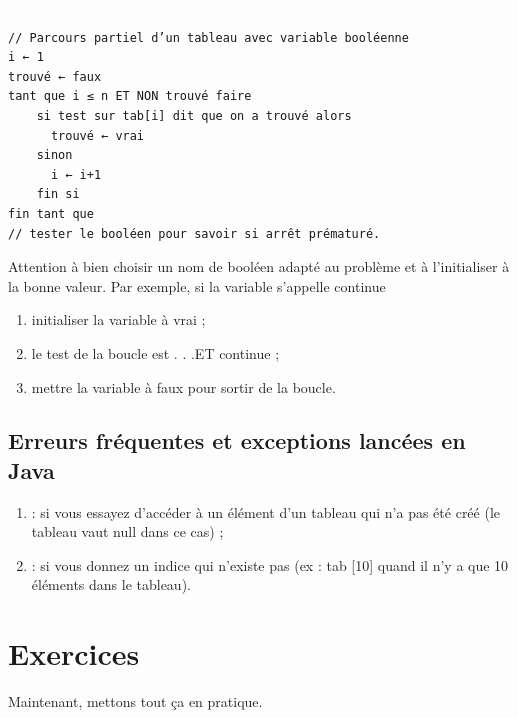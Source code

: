 \documentclass[11pt,a4paper]{article}
\begin{document}
					\textcolor{white}{.} \par
				
            \par
        \begin{verbatim}
// Parcours partiel d’un tableau avec variable booléenne
i ← 1
trouvé ← faux
tant que i ≤ n ET NON trouvé faire
    si test sur tab[i] dit que on a trouvé alors
      trouvé ← vrai
    sinon
      i ← i+1
    fin si
fin tant que
// tester le booléen pour savoir si arrêt prématuré.
      \end{verbatim}
        Attention \`a bien choisir un nom de bool\'een adapt\'e au probl\`eme et \`a l'initialiser \`a la bonne
        valeur. Par exemple, si la variable s'appelle \guillemotleft  continue \guillemotright 
        
					\begin{enumerate}
				
			\item initialiser la variable \`a vrai ;
			\item le test de la boucle est \guillemotleft  . . .ET continue \guillemotright  ;
			\item mettre la variable \`a faux pour sortir de la boucle.
					\end{enumerate}
				
            \par
        \subsection{Erreurs fr\'equentes et exceptions lanc\'ees en Java}
					\begin{enumerate}
				
			\item \verb@NullPointerException@ : 
            si vous essayez d'acc\'eder \`a un \'el\'ement d'un tableau qui n'a pas \'et\'e cr\'e\'e
            (le tableau vaut null dans ce cas) ;
          
			\item \verb@ArrayIndexOutOfBoundsException@ : 
            si vous donnez un indice qui n'existe pas (ex : tab [10] quand il n'y a que 10 \'el\'ements dans le tableau).
          
					\end{enumerate}
				
            \par
        \section{Exercices}
				Maintenant, mettons tout \c ca en pratique.
      
\end{document}
